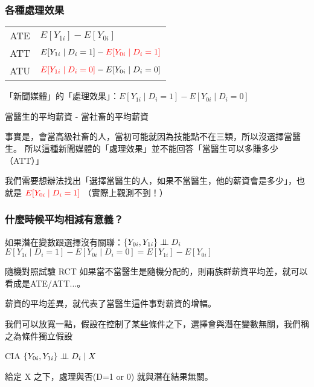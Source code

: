 \begin{frame}
    \frametitle{各種處理效果}
    \begin{table}
        \centering
        \begin{tabular}{c | l}
            \hline
            ATE & $E[Y_{1i}] - E[Y_{0i}]$ \\
            ATT & $E[Y_{1i} \mid D_i=1] - \begingroup \color{red} E[Y_{0i} \mid D_i=1]\endgroup$ \\
            ATU & $\begingroup \color{red}E[Y_{1i} \mid D_i=0] \endgroup -  E[Y_{0i} \mid D_i=0]$ \\
            \hline
        \end{tabular}
    \end{table}
    \vfill
    「新聞媒體」的「處理效果」：$E[Y_{1i} \mid D_i=1] - E[Y_{0i} \mid D_i=0]$

    \small
    當醫生的平均薪資 - 當社畜的平均薪資 

    事實是，會當高級社畜的人，當初可能就因為技能點不在三類，所以沒選擇當醫生。
    所以這種新聞媒體的「處理效果」並不能回答「當醫生可以多賺多少（ATT）」
    
    我們需要想辦法找出「選擇當醫生的人，如果不當醫生，他的薪資會是多少」，也就是
    $\begingroup \color{red} E[Y_{0i} \mid D_i=1]\endgroup$ （實際上觀測不到！）
    \normalsize
    
\end{frame}

\begin{frame}
    \frametitle{什麼時候平均相減有意義？}
    
    如果潛在變數跟選擇沒有關聯：$\{Y_{0i}, Y_{1i}\} \perp \!\!\! \perp D_i$
    $E[Y_{1i} \mid D_i=1] - E[Y_{0i} \mid D_i=0] = E[Y_{1i}] - E[Y_{0i}]$


    \begin{block}{隨機對照試驗 RCT}
        如果當不當醫生是隨機分配的，則兩族群薪資平均差，就可以看成是ATE/ATT...。

        薪資的平均差異，就代表了當醫生這件事對薪資的增幅。
    \end{block}
    我們可以放寬一點，假設在控制了某些條件之下，選擇會與潛在變數無關，我們稱之為條件獨立假設
    \begin{block}{CIA}
        $\{Y_{0i}, Y_{1i}\} \perp \!\!\! \perp D_i \mid X$

        給定 X 之下，處理與否(D=1 or 0) 就與潛在結果無關。
    \end{block}


\end{frame}

